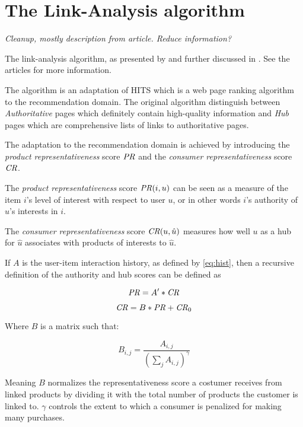\section{The Link-Analysis algorithm}\label{sec:linkanalysis}

\textit{Cleanup, mostly description from article. Reduce information?}

The link-analysis algorithm, as presented by \cite{huang2004link} and further discussed in \cite{huang2007comparison}. See the articles for more information.

The algorithm is an adaptation of HITS \cite{kleinberg1999authoritative} which is a web page ranking algorithm to the recommendation domain. The original algorithm distinguish between \textit{Authoritative} pages which definitely contain high-quality information and \textit{Hub} pages which are comprehensive lists of links to authoritative pages. \citep{huang2007comparison}

The adaptation to the recommendation domain is achieved by introducing the \textit{product representativeness} score $\mathit{PR}$ and the \textit{consumer representativeness} score $\mathit{CR}$.

The \textit{product representativeness} score $\mathit{PR}(i, u)$ can be seen as a measure of the item $i$'s level of interest with respect to user $u$, or in other words $i$'s authority of $u$'s interests in $i$.

The \textit{consumer representativeness} score $\mathit{CR}(u, \hat{u})$ measures how well $u$ as a hub for $\hat{u}$ associates with products of interests to $\hat{u}$.

If $A$ is the user-item interaction history, as defined by \ref{eq:hist}, 
then a recursive definition of the authority and hub scores can be defined as

\begin{equation}
    \mathit{PR} = A' * \mathit{CR}
\end{equation}

\begin{equation}
    \mathit{CR} = B * \mathit{PR} + \mathit{CR}_0
\end{equation}

Where $B$ is a matrix such that:

\begin{equation}
    B_{i, j} = \frac{ A_{i, j} }{ \left(\sum_{j} A_{i, j}\right)^\gamma }
\end{equation}

Meaning $B$ normalizes the representativeness score a costumer receives from linked products by dividing it with the total number of products the customer is linked to.  $\gamma$ controls the extent to which a consumer is penalized for making many purchases.

